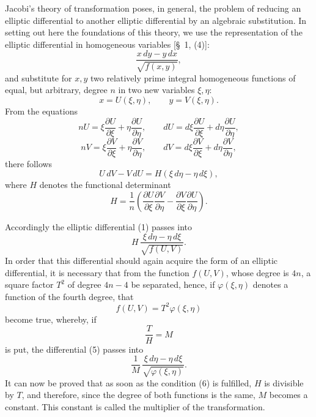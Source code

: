 \documentclass[11pt]{article}
\begin{document}
Jacobi's theory of transformation poses, in general, the problem of reducing an elliptic differential to another elliptic differential by an algebraic substitution. In setting out here the foundations of this theory, we use the representation of the elliptic differential in homogeneous variables [\S~1, (4)]:
\begin{equation}
\frac{x\,dy-y\,dx}{\sqrt{f(x,y)}},
\tag{1}
\end{equation}
and substitute for $x,y$ two relatively prime integral homogeneous functions of equal, but arbitrary, degree $n$ in two new variables $\xi,\eta$:
\begin{equation}
x=U(\xi,\eta),\qquad y=V(\xi,\eta).
\tag{2}
\end{equation}
From the equations
\[
nU=\xi\frac{\partial U}{\partial\xi}+\eta\frac{\partial U}{\partial\eta},\qquad
dU=d\xi\frac{\partial U}{\partial\xi}+d\eta\frac{\partial U}{\partial\eta},
\]
\[
nV=\xi\frac{\partial V}{\partial\xi}+\eta\frac{\partial V}{\partial\eta},\qquad
dV=d\xi\frac{\partial V}{\partial\xi}+d\eta\frac{\partial V}{\partial\eta},
\]
there follows
\begin{equation}
U\,dV-V\,dU=H(\xi\,d\eta-\eta\,d\xi),
\tag{3}
\end{equation}
where $H$ denotes the functional determinant
\begin{equation}
H=\frac1n\left(
\frac{\partial U}{\partial\xi}\frac{\partial V}{\partial\eta}
-
\frac{\partial V}{\partial\xi}\frac{\partial U}{\partial\eta}
\right).
\tag{4}
\end{equation}

Accordingly the elliptic differential (1) passes into
\begin{equation}
H\,\frac{\xi\,d\eta-\eta\,d\xi}{\sqrt{f(U,V)}}.
\tag{5}
\end{equation}
In order that this differential should again acquire the form of an elliptic differential, it is necessary that from the function $f(U,V)$, whose degree is $4n$, a square factor $T^2$ of degree $4n-4$ be separated, hence, if $\varphi(\xi,\eta)$ denotes a function of the fourth degree, that
\begin{equation}
f(U,V)=T^2\varphi(\xi,\eta)
\tag{6}
\end{equation}
become true, whereby, if
\begin{equation}
\frac{T}{H}=M
\tag{7}
\end{equation}
is put, the differential (5) passes into
\begin{equation}
\frac1M\,\frac{\xi\,d\eta-\eta\,d\xi}{\sqrt{\varphi(\xi,\eta)}}.
\tag{8}
\end{equation}
It can now be proved that as soon as the condition (6) is fulfilled, $H$ is divisible by $T$, and therefore, since the degree of both functions is the same, $M$ becomes a constant. This constant is called the multiplier of the transformation.
\end{document}

